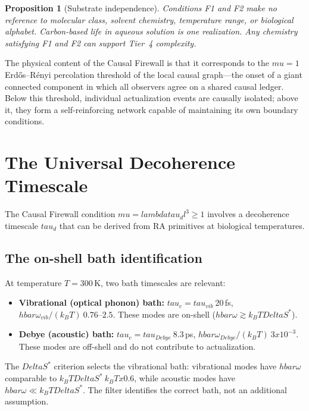 \documentclass[11pt]{article}
\DeclareRobustCommand{\hbar}{\ensuremath{\hslash}}
\def\hbar{hbar}%
\def\ell{l}%
\def\Delta{Delta}%
\def\mu{mu}%
\def\tau{tau}%
\def\lambda{lambda}%
\def\mathrm#1{#1}%
\def\times{x}%
\def\approx{~}%
\newtheorem{proposition}{Proposition}
\begin{document}
\begin{proposition}[Substrate independence]
Conditions F1 and F2 make no reference to molecular class, solvent chemistry, temperature range, or biological alphabet. Carbon-based life in aqueous solution is one realization. Any chemistry satisfying F1 and F2 can support Tier~4 complexity.
\end{proposition}

The physical content of the Causal Firewall is that it corresponds to the $\mu=1$ Erd\H{o}s--R\'enyi percolation threshold of the local causal graph---the onset of a giant connected component in which all observers agree on a shared causal ledger. Below this threshold, individual actualization events are causally isolated; above it, they form a self-reinforcing network capable of maintaining its own boundary conditions.

\section{The Universal Decoherence Timescale}
\label{sec:decoherence}

The Causal Firewall condition $\mu=\lambda\tau_d\ell^3\ge 1$ involves a decoherence timescale $\tau_d$ that can be derived from RA primitives at biological temperatures.

\subsection{The on-shell bath identification}

At temperature $T=300$\,K, two bath timescales are relevant:
\begin{itemize}[nosep]
\item \textbf{Vibrational (optical phonon) bath:} $\tau_c=\tau_{\mathrm{vib}}\approx 20$\,fs, $\hbar\omega_{\mathrm{vib}}/(k_BT)\approx 0.76$--$2.5$. These modes are on-shell ($\hbar\omega \gtrsim k_BT\Delta S^*$).
\item \textbf{Debye (acoustic) bath:} $\tau_c=\tau_{\mathrm{Debye}}\approx 8.3$\,ps, $\hbar\omega_{\mathrm{Debye}}/(k_BT)\approx 3\times 10^{-3}$. These modes are off-shell and do not contribute to actualization.
\end{itemize}

The $\Delta S^*$ criterion selects the vibrational bath: vibrational modes have $\hbar\omega$ comparable to $k_BT\Delta S^*\approx k_BT\times 0.6$, while acoustic modes have $\hbar\omega\ll k_BT\Delta S^*$. The filter identifies the correct bath, not an additional assumption.
\end{document}
